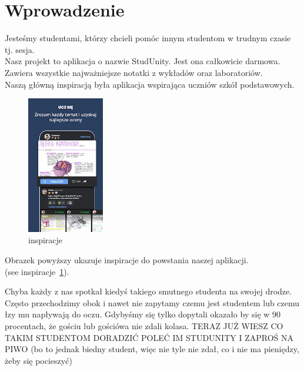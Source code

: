\section{Wprowadzenie}
\label{sec:Wprowadzenie}

    Jesteśmy studentami, którzy chcieli pomóc innym studentom w trudnym czasie tj. sesja. \\ 
    Nasz projekt to aplikacja o nazwie StudUnity. Jest ona całkowicie darmowa. Zawiera wszystkie najważniejsze notatki z wykładów oraz laboratoriów. \\ Naszą główną inspiracją była aplikacja wspirająca uczniów szkół podstawowych.
    
\begin{figure}[htbp]
    \centering
    \includegraphics[width=0.3\textwidth]{pictures/inspriracje.jpg}
    \caption{inspiracje}
    \label{fig:inspiracje}
\end{figure}

\noindent Obrazek powyższy ukazuje inspiracje do powstania naszej aplikacji.\\
(see inspiracje~\ref{fig:inspiracje}).

    Chyba każdy z nas spotkał kiedyś takiego smutnego studenta na swojej drodze. Często przechodzimy obok i nawet nie zapytamy czemu jest studentem lub czemu łzy mu         napływają do oczu. 
    Gdybyśmy się tylko dopytali okazało by się w 90 procentach, że gościu lub gościówa nie zdali kolasa. 
    {{\huge TERAZ JUŻ WIESZ CO TAKIM STUDENTOM DORADZIĆ}}
    {{\Huge POLEĆ IM STUDUNITY I ZAPROŚ NA PIWO}}
    (bo to jednak biedny student, więc nie tyle nie zdał, co i nie ma pieniędzy, żeby się pocieszyć)

\maketitle 

